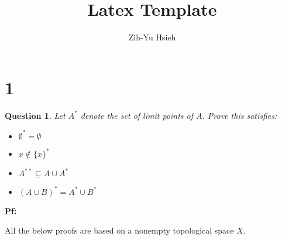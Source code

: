 \documentclass{article}
\title{Latex Template}
\author{Zih-Yu Hsieh}
\newtheorem{question}{Question}
\begin{document}
\maketitle

\section*{1}
\begin{myBox}[]{}
    \begin{question}
        Let $A^*$ denote the set of limit points of $A$. Prove this satisfies:
        \begin{itemize}
            \item $\emptyset^*=\emptyset$
            \item $x\notin \{x\}^*$
            \item $A^{**}\subseteq A\cup A^*$
            \item $(A\cup B)^*=A^*\cup B^*$
        \end{itemize}
    \end{question}
\end{myBox}

\textbf{Pf:}

All the below proofs are based on a nonempty topological space $X$.
\end{document}
